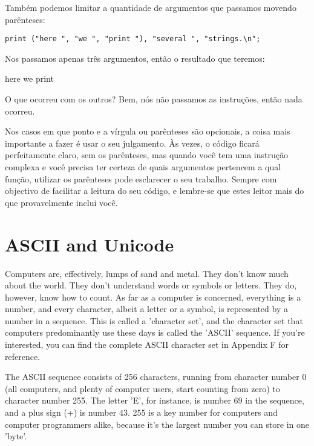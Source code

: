 \documentclass[a4paper,12pt,twoside]{book}
\begin{document}
\noindent Também podemos limitar a quantidade de argumentos que passamos movendo parênteses:

\noindent 

\noindent \texttt{print ("here ", "we ", "print "), "several ", "strings.\textbackslash n";}

\noindent 

\noindent Nos passamos apenas três argumentos, então o resultado que teremos:

\noindent 

\noindent here we print

\noindent 

\noindent O que ocorreu com os outros? Bem, nós não passamos as instruções, então nada ocorreu.

\noindent 

\noindent Nos casos em que ponto e a vírgula ou parênteses são opcionais, a 
coisa  mais importante a fazer é usar o seu julgamento. Às vezes, o código ficará 
perfeitamente claro, sem os parênteses, mas quando você tem uma instrução 
complexa e você precisa ter certeza de quais argumentos pertencem a qual 
função, utilizar os parênteses pode esclarecer o seu trabalho. Sempre 
com objectivo de facilitar a leitura do seu código, e lembre-se 
que estes leitor mais do que provavelmente inclui você.

\noindent 

\section{ASCII and Unicode}

\noindent 

\noindent Computers are, effectively, lumps of sand and metal. 
They don't know much about the world. They don't understand words 
or symbols or letters. They do, however, know how to count. As far 
as a computer is concerned, everything is a number, and every character, 
albeit a letter or a symbol, is represented by a number in a sequence. 
This is called a 'character set', and the character set that computers 
predominantly use these days is called the 'ASCII' sequence. If you're 
interested, you can find the complete ASCII character set in 
Appendix F for reference.

\noindent 

\noindent The ASCII sequence consists of 256 characters, running from 
character number 0 (all computers, and plenty of computer users, start 
counting from zero) to character number 255. The letter 'E', for instance, 
is number 69 in the sequence, and a plus sign (+) is number 43. 255 is a 
key number for computers and computer programmers alike, because it's the 
largest number you can store in one 'byte'.
\end{document}
